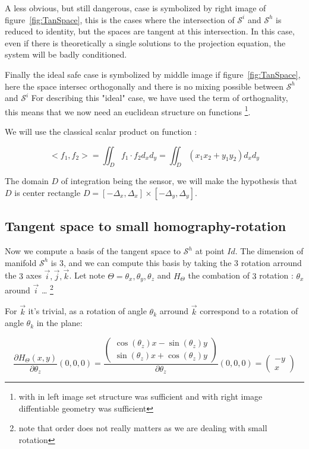 A less obvious, but still dangerous, case is symbolized by right image of figure~\ref{fig:TanSpace},
this is the cases where the intersection of $\mathcal{S}^i$ and $\mathcal{S}^h$   is reduced to 
identity, but the spaces are tangent at this intersection. In this case, even if there is theoretically
a single solutions to  the projection equation, the system will be badly conditioned.

Finally the ideal safe case is symbolized by middle image if figure~\ref{fig:TanSpace}, here
the space intersec orthogonally and there is no mixing possible between $\mathcal{S}^h$ and $\mathcal{S}^i$
For describing this "ideal" case, we have used the term of orthognality, this means that
we  now need an euclidean structure on functions \footnote{with in left image set structure was sufficient
and with right image diffentiable geometry was sufficient}.

We will use the classical scalar product on function :

\begin{equation}
	<f_1,f_2> = \iint_D  f_1 \cdot f_2 d_x d_y  = \iint_D  (x_1 x_2 + y_1 y_2) d_x d_y \label{ProdScalFunc}
\end{equation}

The domain $D$ of integration being the sensor, we will make the hypothesis that $D$ is center rectangle 
$D = [-\Delta_x,\Delta_x] \times [-\Delta_y,\Delta_y] $.



\subsection{Tangent space to small homography-rotation}

Now we compute a basis of the tangent space to $\mathcal{S}^h$ at point $Id$.
The dimension of manifold $\mathcal{S}^h$ is $3$, and we can compute this basis
by taking the $3$ rotation arround the $3$ axes $\vec{i},\vec{j},\vec{k}$.
Let note $\Theta= \theta_x,\theta_y,\theta_z$  and $H_\Theta$ the
combation of $3$ rotation : $\theta_x$ around $\vec{i}$ \dots
\footnote{note that order does not really matters as we are dealing with small rotation}


For $\vec{k}$ it's trivial, as a rotation of angle $\theta_k$ arround 
$\vec{k}$ correspond to a rotation of angle $\theta_k$ in the plane:

\begin{equation}
	\frac{\partial H_\Theta(x,y)}{\partial \theta_z} (0,0,0) 
	= \frac{\begin{pmatrix} \cos(\theta_z) x - \sin(\theta_z)y \\ \sin(\theta_z)x + \cos(\theta_z)y \end{pmatrix}}{\partial \theta_z}  (0,0,0)
	= \begin{pmatrix} -y \\  x \end{pmatrix}
\end{equation}

